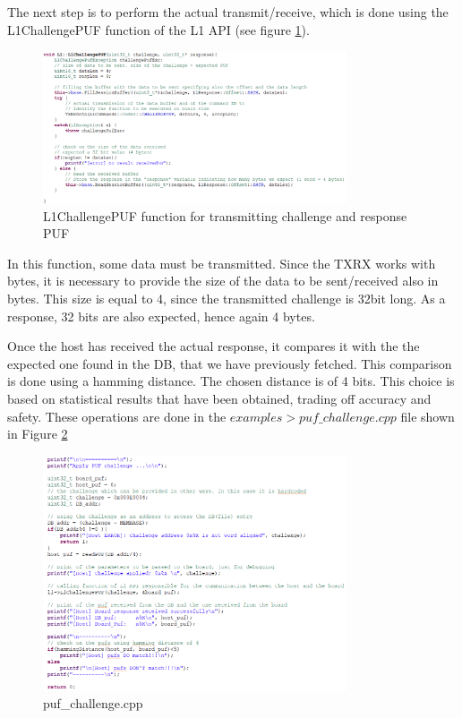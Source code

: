 The next step is to perform the actual transmit/receive, which is done using the L1ChallengePUF function of the L1 API (see figure \ref{fig:L1ChallengePUF}).

\begin{figure}[h!]
	\vspace{0.5cm}
	\includegraphics[width = 0.8\textwidth]{images/L1ChallengePUF.png}
	\caption{L1ChallengePUF function for transmitting challenge and response PUF}
	\label{fig:L1ChallengePUF}
\end{figure}


In this function, some data must be transmitted. Since the TXRX works with bytes, it is necessary to provide the size of the data to be sent/received also in bytes. This size is equal to 4, since the transmitted challenge is 32bit long. As a response, 32 bits are also expected, hence again 4 bytes.

Once the host has received the actual response, it compares it with the the expected one found in the DB, that we have previously fetched. This comparison is done using a hamming distance. The chosen distance is of 4 bits. This choice is based on statistical results that have been obtained, trading off accuracy and safety. These operations are done in the $examples > puf\_challenge.cpp$ file shown in Figure \ref{fig:puf_challenge.cpp}

\begin{figure}[h!]
	\vspace{0.5cm}
	\includegraphics[width = 0.8\textwidth]{images/puf_challenge.png}
	\caption{puf\_challenge.cpp}
	\label{fig:puf_challenge.cpp}
\end{figure}

